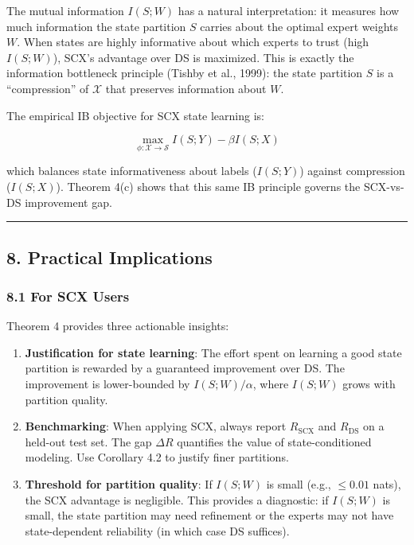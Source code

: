 \documentclass[
  12pt,
]{ctexart}
\begin{document}
The mutual information \(I(S; W)\) has a natural interpretation: it
measures how much information the state partition \(S\) carries about
the optimal expert weights \(W\). When states are highly informative
about which experts to trust (high \(I(S; W)\)), SCX's advantage over DS
is maximized. This is exactly the information bottleneck principle
(Tishby et al., 1999): the state partition \(S\) is a ``compression'' of
\(\mathcal{X}\) that preserves information about \(W\).

The empirical IB objective for SCX state learning is:

\[\max_{\phi: \mathcal{X} \to \mathcal{S}} I(S; Y) - \beta I(S; X)\]

which balances state informativeness about labels (\(I(S; Y)\)) against
compression (\(I(S; X)\)). Theorem 4(c) shows that this same IB
principle governs the SCX-vs-DS improvement gap.

\begin{center}\rule{0.5\linewidth}{0.5pt}\end{center}

\subsection{8. Practical Implications}\label{practical-implications}

\subsubsection{8.1 For SCX Users}\label{for-scx-users}

Theorem 4 provides three actionable insights:

\begin{enumerate}
\def\labelenumi{\arabic{enumi}.}
\item
  \textbf{Justification for state learning}: The effort spent on
  learning a good state partition is rewarded by a guaranteed
  improvement over DS. The improvement is lower-bounded by
  \(I(S; W)/\alpha\), where \(I(S; W)\) grows with partition quality.
\item
  \textbf{Benchmarking}: When applying SCX, always report
  \(R_{\text{SCX}}\) and \(R_{\text{DS}}\) on a held-out test set. The
  gap \(\Delta R\) quantifies the value of state-conditioned modeling.
  Use Corollary 4.2 to justify finer partitions.
\item
  \textbf{Threshold for partition quality}: If \(I(S; W)\) is small
  (e.g., \(\leq 0.01\) nats), the SCX advantage is negligible. This
  provides a diagnostic: if \(I(S; W)\) is small, the state partition
  may need refinement or the experts may not have state-dependent
  reliability (in which case DS suffices).
\end{enumerate}
\end{document}
